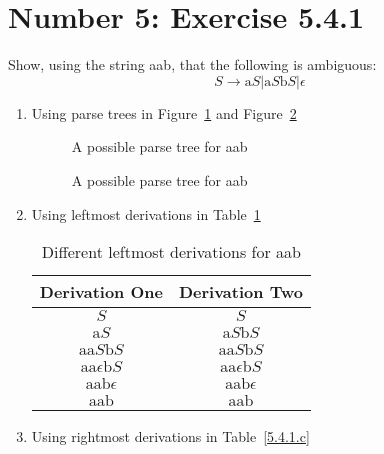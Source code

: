 \documentclass[12pt,a4paper,twoside]{article}  %
\begin{document}
\section{Number 5: Exercise 5.4.1}

Show, using the string aab, that the following is ambiguous:
\begin{equation}
S \rightarrow \textrm{a}S | \textrm{a}S\textrm{b}S | \epsilon
\end{equation}

\begin{enumerate}

\item Using parse trees in Figure~\ref{5.4.1.a-1} and
  Figure~\ref{5.4.1.a-2}

\begin{figure}

\caption{A possible parse tree for aab}\label{5.4.1.a-1}
\end{figure}

\begin{figure}

\caption{A possible parse tree for aab}\label{5.4.1.a-2}
\end{figure}

\item Using leftmost derivations in Table~\ref{5.4.1.b}

\begin{table}
\begin{tabular}{c || c }
Derivation One & Derivation Two \\
\hline\hline
$S$                               & $S$ \\
$\textrm{a}S$                     & $\textrm{a}S\textrm{b}S$ \\
$\textrm{aa}S\textrm{b}S$         & $\textrm{aa}S\textrm{b}S$ \\
$\textrm{aa}\epsilon\textrm{b}S$  & $\textrm{aa}\epsilon\textrm{b}S$ \\
$\textrm{aab}\epsilon$            & $\textrm{aab}\epsilon$ \\
$\textrm{aab}$                    & $\textrm{aab}$
\end{tabular}
\caption{Different leftmost derivations for aab}\label{5.4.1.b}
\end{table}

\item Using rightmost derivations in Table~\ref{5.4.1.c}


\end{enumerate}
\end{document}
